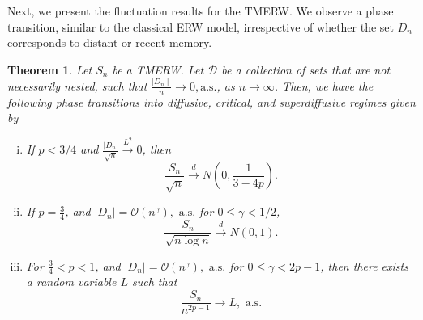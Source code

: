 \documentclass{article}
\numberwithin{equation}{section}
\newtheorem{theorem}{Theorem}[section]
\newcommand{\1}{\mathbf{1}}
\newcommand{\0}{\mathbf{0}}
\begin{document}
Next, we present the fluctuation results for the TMERW.
We observe a phase transition, similar to the classical ERW model, irrespective of whether the set $D_n$ corresponds to distant or recent memory.
\begin{theorem}
\label{Thm: CLT_D_n/n_goes_to_zero} 
Let $S_n$ be a TMERW. 
Let $\mathcal{D}$ be a collection of sets that are not necessarily nested, such that $\frac{\mid D_n \mid }{n} \rightarrow 0, \text{a.s.}$, as $n \to \infty$. Then, we have the following phase transitions into diffusive, critical, and superdiffusive regimes given by 
\begin{enumerate}[(i)]
\item If $ p < 3/4$ and $\frac{|D_n|}{\sqrt{n}}\stackrel{L^2}{\longrightarrow} 0 $, then 
\begin{equation*}
\label{Eq: D_n_goes_to_zero_sub-diffussive}
\frac{S_n}{\sqrt{n}} \stackrel{d}{\longrightarrow} N \left(0, \frac{1}{3-4p}\right).
\end{equation*}
\item If $p =\frac{3}{4}$, and $|D_n| = \mathcal{O}(n^{\gamma}), \text{ a.s.}$ for $0 \le \gamma < 1/2$, 
\begin{equation*}
\frac{S_n}{\sqrt{n \log n }}\stackrel{d}{\longrightarrow} N (0,1).
\end{equation*}
\item For $\frac{3}{4}<p<1$, and $|D_n| = \mathcal{O }(n^{\gamma}), \text{ a.s.}$ for $0 \le \gamma < 2p-1$, then there exists a random variable $L$ such that
\begin{equation}
\label{Eq: CLT_D_n_to_zero_p_ge_3/4}
\frac{S_n}{n^{2p-1}}\rightarrow L, \text{ a.s.}
\end{equation}
\end{enumerate}
\end{theorem}
\end{document}
